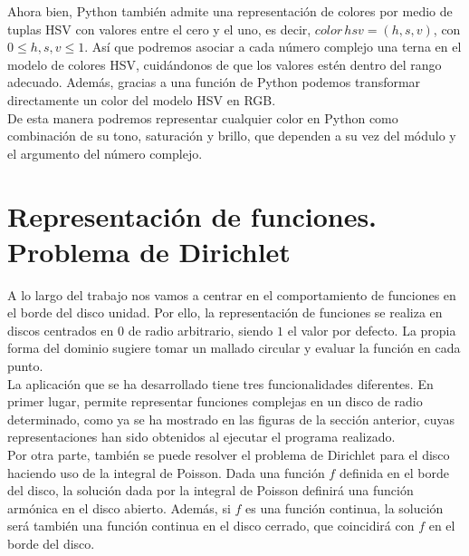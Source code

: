 Ahora bien, Python también admite una representación de colores por medio de tuplas HSV con valores entre el cero y el uno, es decir, $color \, hsv = (h, s, v)$, con $0 \leq h, s, v \leq 1$. Así que podremos asociar a cada número complejo una terna en el modelo de colores HSV, cuidándonos de que los valores estén dentro del rango adecuado. Además, gracias a una función de Python podemos transformar directamente un color del modelo HSV en RGB. \\

De esta manera podremos representar cualquier color en Python como combinación de su tono, saturación y brillo, que dependen a su vez del módulo y el argumento del número complejo. \\


\section{Representación de funciones. Problema de Dirichlet}

A lo largo del trabajo nos vamos a centrar en el comportamiento de funciones en el borde del disco unidad. Por ello, la representación de funciones se realiza en discos centrados en $0$ de radio arbitrario, siendo $1$ el valor por defecto. La propia forma del dominio sugiere tomar un mallado circular y evaluar la función en cada punto. \\

La aplicación que se ha desarrollado tiene tres funcionalidades diferentes. En primer lugar, permite representar funciones complejas en un disco de radio determinado, como ya se ha mostrado en las figuras de la sección anterior, cuyas representaciones han sido obtenidos al ejecutar el programa realizado. \\

Por otra parte, también se puede resolver el problema de Dirichlet para el disco haciendo uso de la integral de Poisson. Dada una función $f$ definida en el borde del disco, la solución dada por la integral de Poisson definirá una función armónica en el disco abierto. Además, si $f$ es una función continua, la solución será también una función continua en el disco cerrado, que coincidirá con $f$ en el borde del disco. \\

